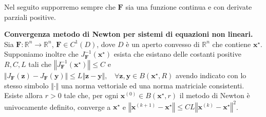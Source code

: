 \documentclass[8pt,a4paper]{article}
\begin{document}
\begin{multicols}{2}
Nel seguito supporremo sempre che $\mathbf{F}$ sia una funzione continua e con derivate parziali positive.

\textbf{Convergenza metodo di Newton per sistemi di equazioni non lineari.} Sia $\mathbf{F} :\mathbb{R}^{n}\rightarrow \mathbb{R}^{n}$, $\mathbf{F} \in C^{1}( D)$, dove $D$ è un aperto convesso di $\mathbb{R}^{n}$ che contiene $\mathbf{x}^{\star }$. Supponiamo inoltre che $J^{-1}_{\mathbf{F}}\left(\mathbf{x}^{\star }\right)$ esista che esistano delle costanti positive $R,C,L$ tali che $\left\Vert J^{-1}_{\mathbf{F}}\left(\mathbf{x}^{\star }\right)\right\Vert \leqslant C$ e $\Vert J_{\mathbf{F}}(\mathbf{z}) -J_{\mathbf{F}}(\mathbf{y})\Vert \leqslant L\Vert \mathbf{z} -\mathbf{y}\Vert ,\ \ \ \ \forall \mathbf{z} ,\mathbf{y} \in B\left(\mathbf{x}^{\star } ,R\right)$ avendo indicato con lo stesso simbolo $\Vert \cdotp \Vert $ una norma vettoriale ed una norma matriciale consistenti. Esiste allora $r >0$ tale che, per ogni $\mathbf{x}^{(0)} \in B\left(\mathbf{x}^{\star } ,r\right)$ il metodo di Newton è univocamente definito, converge a $\mathbf{x}^{\star }$ e $\left\Vert \mathbf{x}^{(k+1)} -\mathbf{x}^{\star }\right\Vert \leq CL\left\Vert \mathbf{x}^{(k)} -\mathbf{x}^{\star }\right\Vert ^{2}$.
\end{multicols}
\end{document}

